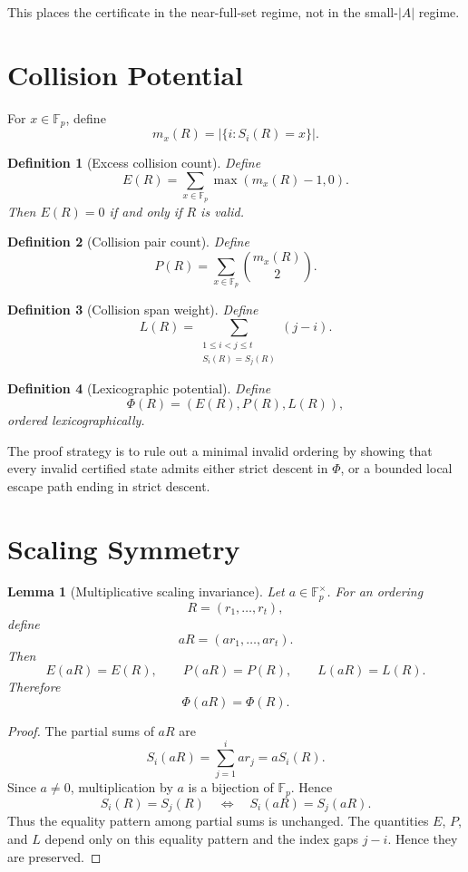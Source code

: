 \documentclass[11pt]{article}
\newtheorem{lemma}{Lemma}
\newtheorem{definition}{Definition}
\newcommand{\Fp}{\mathbb{F}_p}
\newcommand{\Fpx}{\mathbb{F}_p^\times}
\newcommand{\PhiPot}{\Phi}
\begin{document}
This places the certificate in the near-full-set regime, not in the small-\(|A|\) regime.

\section{Collision Potential}

For \(x\in\Fp\), define
\[
m_x(R)=|\{i:S_i(R)=x\}|.
\]

\begin{definition}[Excess collision count]
Define
\[
E(R)=\sum_{x\in\Fp}\max(m_x(R)-1,0).
\]
Then \(E(R)=0\) if and only if \(R\) is valid.
\end{definition}

\begin{definition}[Collision pair count]
Define
\[
P(R)=\sum_{x\in\Fp}\binom{m_x(R)}{2}.
\]
\end{definition}

\begin{definition}[Collision span weight]
Define
\[
L(R)=
\sum_{\substack{1\le i<j\le t\\S_i(R)=S_j(R)}}(j-i).
\]
\end{definition}

\begin{definition}[Lexicographic potential]
Define
\[
\PhiPot(R)=(E(R),P(R),L(R)),
\]
ordered lexicographically.
\end{definition}

The proof strategy is to rule out a minimal invalid ordering by showing that every invalid certified state admits either strict descent in \(\PhiPot\), or a bounded local escape path ending in strict descent.

\section{Scaling Symmetry}

\begin{lemma}[Multiplicative scaling invariance]
Let \(a\in\Fpx\). For an ordering
\[
R=(r_1,\ldots,r_t),
\]
define
\[
aR=(ar_1,\ldots,ar_t).
\]
Then
\[
E(aR)=E(R),\qquad P(aR)=P(R),\qquad L(aR)=L(R).
\]
Therefore
\[
\PhiPot(aR)=\PhiPot(R).
\]
\end{lemma}

\begin{proof}
The partial sums of \(aR\) are
\[
S_i(aR)=\sum_{j=1}^{i}ar_j=aS_i(R).
\]
Since \(a\ne0\), multiplication by \(a\) is a bijection of \(\Fp\). Hence
\[
S_i(R)=S_j(R)
\quad\Longleftrightarrow\quad
S_i(aR)=S_j(aR).
\]
Thus the equality pattern among partial sums is unchanged. The quantities \(E\), \(P\), and \(L\) depend only on this equality pattern and the index gaps \(j-i\). Hence they are preserved.
\end{proof}
\end{document}
